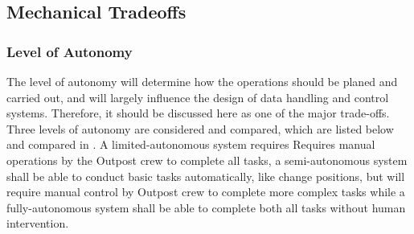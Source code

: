 \subsection{Mechanical Tradeoffs}
\subsubsection{Level of Autonomy}
The level of autonomy will determine how the operations should be planed and carried out, and will largely influence the design of data handling and control systems. Therefore, it should be discussed here as one of the major trade-offs. Three levels of autonomy are considered and compared, which are listed below and compared in . A limited-autonomous system requires Requires manual operations by the Outpost crew to complete all tasks, a semi-autonomous system shall be able to conduct basic tasks automatically, like change positions, but will require manual control by Outpost crew to complete more complex tasks while a fully-autonomous system shall be able to complete both all tasks without human intervention. 


